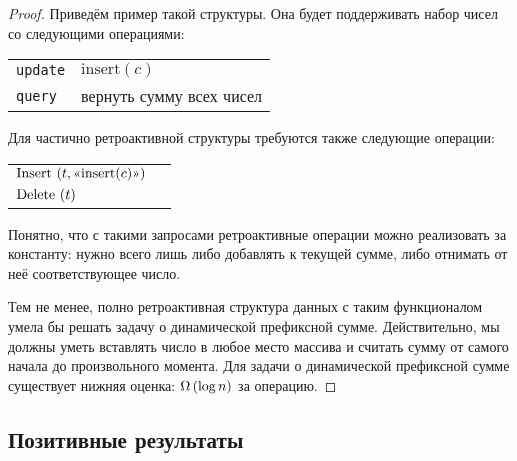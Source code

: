 \begin{proof}
	Приведём пример такой структуры. Она будет поддерживать набор чисел со следующими операциями:

\begin{center} \begin{tabular}{ll}
	{\tt update} & $\text{insert} (c)$ \\
	{\tt query} & вернуть сумму всех чисел
\end{tabular} \end{center}

	Для частично ретроактивной структуры требуются также следующие операции:

\begin{center} \begin{tabular}{ll}
	$\text{Insert}\, \left( t, \text{«} \text{insert} (c) \text{»}\right)$ \\
	$\text{Delete}\, \left( t \right)$
\end{tabular} \end{center}

	Понятно, что с такими запросами ретроактивные операции можно реализовать за константу: нужно всего лишь либо добавлять к текущей сумме, либо отнимать от неё соответствующее число.
	
	Тем не менее, полно ретроактивная структура данных с таким функционалом умела бы решать задачу о динамической префиксной сумме. Действительно, мы должны уметь вставлять число в любое место массива и считать сумму от самого начала до произвольного момента. Для задачи о динамической префиксной сумме существует нижняя оценка: $\Omega \left( \log n \right)$ за операцию.

\end{proof}

\subsection{Позитивные результаты}
